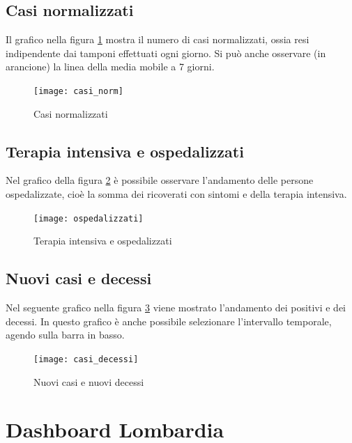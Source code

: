 \subsection{Casi normalizzati}
Il grafico nella figura \ref{fig:casi_normalizzati} mostra il numero di casi normalizzati, ossia resi indipendente dai tamponi effettuati ogni giorno.
Si può anche osservare (in arancione) la linea della media mobile a 7 giorni.
\begin{figure}[htp]
    \centering
    \texttt{[image: casi\_norm]}
    \caption{Casi normalizzati}
    \label{fig:casi_normalizzati}
\end{figure}

\subsection{Terapia intensiva e ospedalizzati}
Nel grafico della figura \ref{fig:ti_ospdedalizzati} è possibile osservare l'andamento delle persone ospedalizzate, cioè la somma dei ricoverati con sintomi e della terapia intensiva.
\begin{figure}[htp]
    \centering
    \texttt{[image: ospedalizzati]}
    \caption{Terapia intensiva e ospedalizzati}
    \label{fig:ti_ospdedalizzati}
\end{figure}


\subsection{Nuovi casi e decessi}
Nel seguente grafico nella figura \ref{fig:casi_decessi} viene mostrato l'andamento dei positivi e dei decessi.
In questo grafico è anche possibile selezionare l'intervallo temporale, agendo sulla barra in basso.
\begin{figure}[htp]
    \centering
    \texttt{[image: casi\_decessi]}
    \caption{Nuovi casi e nuovi decessi}
    \label{fig:casi_decessi}
\end{figure}

\section{Dashboard Lombardia}

